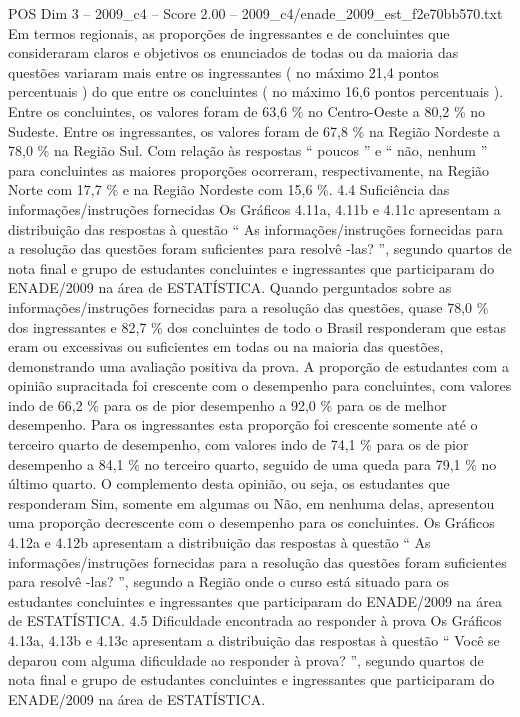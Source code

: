 \begin{textsample}{POS Dim 3 – 2009\_c4 – Score 2.00 – 2009\_c4/enade\_2009\_est\_f2e70bb570.txt}
Em termos regionais, as proporções de ingressantes e de concluintes que consideraram claros e objetivos os enunciados de todas ou da maioria das questões variaram mais entre os ingressantes ( no máximo 21,4 pontos percentuais ) do que entre os concluintes ( no máximo 16,6 pontos percentuais ).
Entre os concluintes, os valores foram de 63,6 \% no Centro-Oeste a 80,2 \% no Sudeste.
Entre os ingressantes, os valores foram de 67,8 \% na Região Nordeste a 78,0 \% na Região Sul.
Com relação às respostas “ poucos ” e “ não, nenhum ” para concluintes as maiores proporções ocorreram, respectivamente, na Região Norte com 17,7 \% e na Região Nordeste com 15,6 \%. 4.4 Suficiência das informações/instruções fornecidas Os Gráficos 4.11a, 4.11b e 4.11c apresentam a distribuição das respostas à questão “ As informações/instruções fornecidas para a resolução das questões foram suficientes para resolvê -las? ”, segundo quartos de nota final e grupo de estudantes concluintes e ingressantes que participaram do ENADE/2009 na área de ESTATÍSTICA.
Quando perguntados sobre as informações/instruções fornecidas para a resolução das questões, quase 78,0 \% dos ingressantes e 82,7 \% dos concluintes de todo o Brasil responderam que estas eram ou excessivas ou suficientes em todas ou na maioria das questões, demonstrando uma avaliação positiva da prova.
A proporção de estudantes com a opinião supracitada foi crescente com o desempenho para concluintes, com valores indo de 66,2 \% para os de pior desempenho a 92,0 \% para os de melhor desempenho.
Para os ingressantes esta proporção foi crescente somente até o terceiro quarto de desempenho, com valores indo de 74,1 \% para os de pior desempenho a 84,1 \% no terceiro quarto, seguido de uma queda para 79,1 \% no último quarto.
O complemento desta opinião, ou seja, os estudantes que responderam Sim, somente em algumas ou Não, em nenhuma delas, apresentou uma proporção decrescente com o desempenho para os concluintes.
Os Gráficos 4.12a e 4.12b apresentam a distribuição das respostas à questão “ As informações/instruções fornecidas para a resolução das questões foram suficientes para resolvê -las? ”, segundo a Região onde o curso está situado para os estudantes concluintes e ingressantes que participaram do ENADE/2009 na área de ESTATÍSTICA. 4.5 Dificuldade encontrada ao responder à prova Os Gráficos 4.13a, 4.13b e 4.13c apresentam a distribuição das respostas à questão “ Você se deparou com alguma dificuldade ao responder à prova? ”, segundo quartos de nota final e grupo de estudantes concluintes e ingressantes que participaram do ENADE/2009 na área de ESTATÍSTICA.

\end{textsample}
